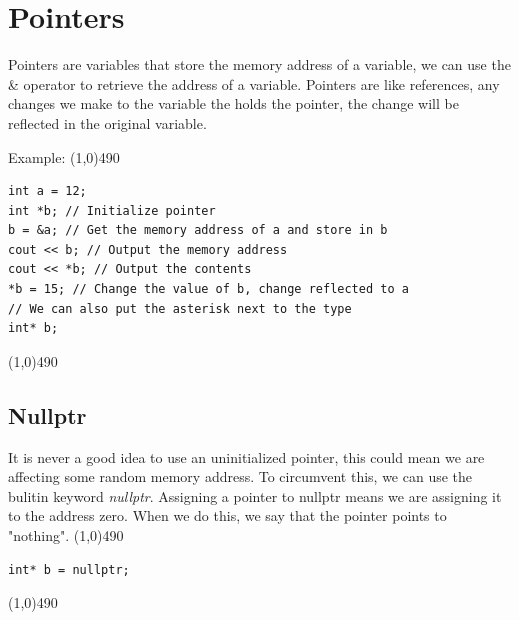 \documentclass{report}
\begin{document}
    \pagebreak \bigbreak \noindent 
    \section{\LARGE Pointers}
    \bigbreak \noindent 
    \begin{concept}
 Pointers are variables that store the memory address of a variable, we can use the \& operator to retrieve the address of a variable. Pointers are like references, any changes we make to the variable the holds the pointer, the change will be reflected in the original variable.
	\end{concept}
    \bigbreak \noindent 
    \bigbreak \noindent 
    Example:
    \bigbreak \noindent 
    \line(1,0){490}
    \begin{verbatim}
int a = 12;
int *b; // Initialize pointer  
b = &a; // Get the memory address of a and store in b
cout << b; // Output the memory address
cout << *b; // Output the contents
*b = 15; // Change the value of b, change reflected to a
// We can also put the asterisk next to the type
int* b;
    \end{verbatim}
    \line(1,0){490}

    \bigbreak \noindent 
    \subsection{Nullptr}
    \bigbreak \noindent 
    It is never a good idea to use an uninitialized pointer, this could mean we are affecting some random memory address. To circumvent this, we can use the bulitin keyword \textit{nullptr}. Assigning a pointer to nullptr means we are assigning it to the address zero. When we do this, we say that the pointer points to "nothing".
    \bigbreak \noindent 
    \line(1,0){490}
    \begin{verbatim}
int* b = nullptr;
    \end{verbatim}
    \line(1,0){490}
    \bigbreak \noindent 

    \pagebreak\bigbreak \noindent 
\end{document}
